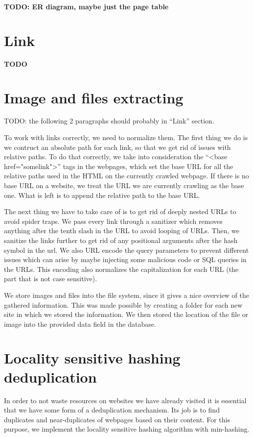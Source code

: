 \documentclass[9pt]{IEEEtran}
\begin{document}
\textbf{TODO: ER diagram, maybe just the page table}

\section{Link}
\textbf{TODO}

\section{Image and files extracting}

TODO: the following 2 paragraphs should probably in ``Link'' section.

To work with links correctly, we need to normalize them.
The first thing we do is we contruct an absolute path for each link, so that we get rid of issues with relative paths.
To do that correctly, we take into consideration the ``<base href="somelink">'' tags in the webpages, which set the base URL for all the relative paths used in the HTML on the currently crawled webpage.
If there is no base URL on a website, we treat the URL we are currently crawling as the base one.
What is left is to append the relative path to the base URL.

The next thing we have to take care of is to get rid of deeply nested URLs to avoid spider traps.
We pass every link through a sanitizer which removes anything after the tenth slash in the URL to avoid looping of URLs.
Then, we sanitize the links further to get rid of any positional arguments after the hash symbol in the url.
We also URL encode the query parameters to prevent different issues which can arise by maybe injecting some malicious code or SQL queries in the URLs.
This encoding also normalizes the capitalization for each URL (the part that is not case sensitive).

We store images and files into the file system, since it gives a nice overview of the gathered information. 
This was made possible by creating a folder for each new site in which we stored the information. 
We then stored the location of the file or image into the provided data field in the database.


\section{Locality sensitive hashing deduplication}

In order to not waste resources on websites we have already visited it is essential that we have some form of a deduplication mechanism.
Its job is to find duplicates and near-duplicates of webpages based on their content.
For this purpose, we implement the locality sensitive hashing algorithm \cite{Gionis1999} with min-hashing.
\end{document}
